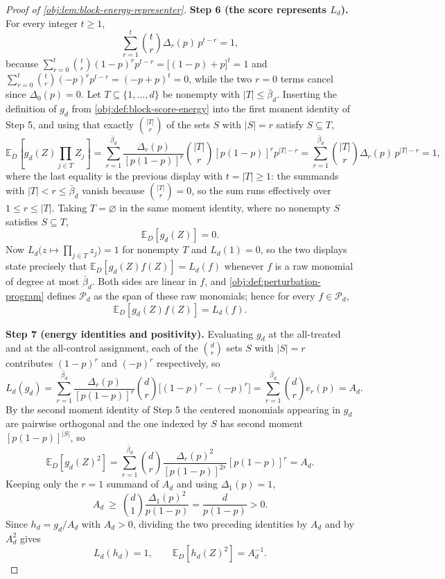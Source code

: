 \documentclass[11pt]{article}
\begin{document}
\begin{proof}[Proof of \cref{obj:lem:block-energy-representer}]
\textbf{Step 6 (the score represents \(L_d\)).}
For every integer \(t\ge1\),
\[
\sum_{r=1}^{t}\binom t r\Delta_r(p)\,p^{t-r}=1,
\]
because \(\sum_{r=0}^{t}\binom t r(1-p)^rp^{t-r}=\bigl[(1-p)+p\bigr]^t=1\) and \(\sum_{r=0}^{t}\binom t r(-p)^rp^{t-r}=(-p+p)^t=0\), while the two \(r=0\) terms cancel since \(\Delta_0(p)=0\). %
Let \(T\subseteq\{1,\ldots,d\}\) be nonempty with \(|T|\le\bar\beta_d\).  Inserting the definition of \(g_d\) from \cref{obj:def:block-score-energy} into the first moment identity of Step 5, and using that exactly \(\binom{|T|}{r}\) of the sets \(S\) with \(|S|=r\) satisfy \(S\subseteq T\),
\[
\mathbb E_D\!\left[g_d(Z)\prod_{j\in T}Z_j\right]
=\sum_{r=1}^{\bar\beta_d}\frac{\Delta_r(p)}{[p(1-p)]^r}\binom{|T|}{r}[p(1-p)]^{r}p^{|T|-r}
=\sum_{r=1}^{\bar\beta_d}\binom{|T|}{r}\Delta_r(p)\,p^{|T|-r}
=1,
\]
where the last equality is the previous display with \(t=|T|\ge1\): the summands with \(|T|<r\le\bar\beta_d\) vanish because \(\binom{|T|}{r}=0\), so the sum runs effectively over \(1\le r\le|T|\). %
Taking \(T=\varnothing\) in the same moment identity, where no nonempty \(S\) satisfies \(S\subseteq T\),
\[
\mathbb E_D[g_d(Z)]=0 .
\]
Now \(L_d\bigl(z\mapsto\prod_{j\in T}z_j\bigr)=1\) for nonempty \(T\) and \(L_d(1)=0\), so the two displays state precisely that \(\mathbb E_D[g_d(Z)f(Z)]=L_d(f)\) whenever \(f\) is a raw monomial of degree at most \(\bar\beta_d\).  Both sides are linear in \(f\), and \cref{obj:def:perturbation-program} defines \(\mathcal P_d\) as the span of these raw monomials; hence for every \(f\in\mathcal P_d\),
\[
\mathbb E_D[g_d(Z)f(Z)]=L_d(f).
\]

\textbf{Step 7 (energy identities and positivity).}
Evaluating \(g_d\) at the all-treated and at the all-control assignment, each of the \(\binom d r\) sets \(S\) with \(|S|=r\) contributes \((1-p)^r\) and \((-p)^r\) respectively, so
\[
L_d(g_d)=\sum_{r=1}^{\bar\beta_d}\frac{\Delta_r(p)}{[p(1-p)]^r}\binom d r\bigl[(1-p)^r-(-p)^r\bigr]
=\sum_{r=1}^{\bar\beta_d}\binom d r e_r(p)=A_d .
\]
By the second moment identity of Step 5 the centered monomials appearing in \(g_d\) are pairwise orthogonal and the one indexed by \(S\) has second moment \([p(1-p)]^{|S|}\), so
\[
\mathbb E_D[g_d(Z)^2]
=\sum_{r=1}^{\bar\beta_d}\binom d r\frac{\Delta_r(p)^2}{[p(1-p)]^{2r}}[p(1-p)]^{r}
=A_d .
\]
Keeping only the \(r=1\) summand of \(A_d\) and using \(\Delta_1(p)=1\),
\[
A_d\ \ge\ \binom d 1\frac{\Delta_1(p)^2}{p(1-p)}=\frac{d}{p(1-p)}>0 .
\]
Since \(h_d=g_d/A_d\) with \(A_d>0\), dividing the two preceding identities by \(A_d\) and by \(A_d^2\) gives
\[
L_d(h_d)=1,
\qquad
\mathbb E_D[h_d(Z)^2]=A_d^{-1}.
\]


\end{proof}
\end{document}
